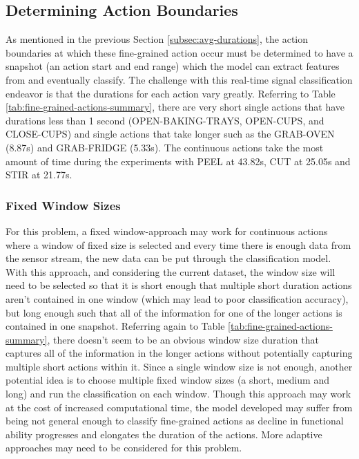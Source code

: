 \clearpage
\subsection{Determining Action Boundaries}

As mentioned in the previous Section \ref{subsec:avg-durations}, the action boundaries at which these fine-grained action occur must be determined to have a snapshot (an action start and end range) which the model can extract features from and eventually classify. The challenge with this real-time signal classification endeavor is that the durations for each action vary greatly. Referring to Table \ref{tab:fine-grained-actions-summary}, there are very short single actions that have durations less than 1 second (OPEN-BAKING-TRAYS, OPEN-CUPS, and CLOSE-CUPS) and single actions that take longer such as the GRAB-OVEN (8.87s) and GRAB-FRIDGE (5.33s). The continuous actions take the most amount of time during the experiments with PEEL at 43.82s, CUT at 25.05s and STIR at 21.77s.

\subsubsection{Fixed Window Sizes}
For this problem, a fixed window-approach may work for continuous actions where a window of fixed size is selected and every time there is enough data from the sensor stream, the new data can be put through the classification model. With this approach, and considering the current dataset, the window size will need to be selected so that it is short enough that multiple short duration actions aren't contained in one window (which may lead to poor classification accuracy), but long enough such that all of the information for one of the longer actions is contained in one snapshot. Referring again to Table \ref{tab:fine-grained-actions-summary}, there doesn't seem to be an obvious window size duration that captures all of the information in the longer actions without potentially capturing multiple short actions within it. Since a single window size is not enough, another potential idea is to choose multiple fixed window sizes (a short, medium and long) and run the classification on each window. Though this approach may work at the cost of increased computational time, the model developed may suffer from being not general enough to classify fine-grained actions as decline in functional ability progresses and elongates the duration of the actions. More adaptive approaches may need to be considered for this problem.

